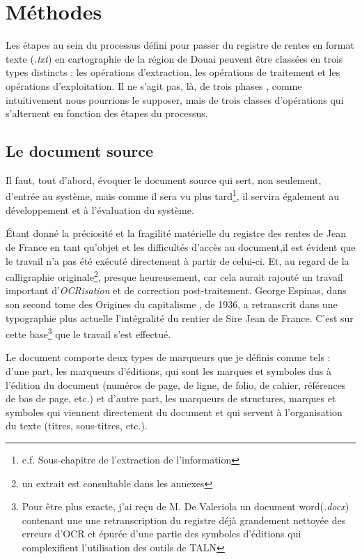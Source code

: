 \chapter{Méthodes}
Les étapes au sein du processus défini pour passer du registre de rentes en format texte (\textit{.txt}) en cartographie de la région de Douai peuvent être classées en trois types distincts : les opérations d’extraction, les opérations de traitement et les opérations d’exploitation. Il ne s’agit pas, là, de trois phases , comme intuitivement nous pourrions le supposer, mais de trois classes d'opérations qui s’alternent en fonction des étapes du processus.

\section{Le document source}
Il faut, tout d'abord, évoquer le document source qui sert, non seulement, d'entrée au système, mais comme  il sera vu plus tard\footnote{c.f. Sous-chapitre de l'extraction de l'information}, il servira également au développement et à l'évaluation du système.

Étant donné la préciosité et la fragilité matérielle du registre des rentes de Jean de France en tant qu'objet et les difficultés d'accès au document,il est évident que le travail n'a pas été exécuté directement à partir de celui-ci. Et, au regard de la calligraphie originale\footnote{un extrait est consultable dans les annexes}, presque heureusement, car cela aurait rajouté un travail important d'\textit{OCRisation} et de correction post-traitement. 
George Espinas, dans son second tome des \og Origines du capitalisme \fg , de 1936, a retranscrit dans une typographie plus actuelle l'intégralité du rentier de Sire Jean de France. C'est sur cette base\footnote{Pour être plus exacte, j'ai reçu de M. De Valeriola un document word(\textit{.docx}) contenant une une retranscription du registre déjà  grandement nettoyée des erreurs d'OCR et épurée d'une partie des symboles d'éditions qui complexifient l'utilisation des  outils de TALN} que le travail s'est effectué.

Le document comporte deux types de marqueurs que je définis comme tels : d'une part, les marqueurs d'éditions, qui sont les marques et symboles dus à l'édition du document (numéros de page, de ligne, de folio, de cahier, références de bas de page, etc.) et d'autre part, les marqueurs de structures, marques et symboles qui viennent directement du document et qui servent à l'organisation du texte (titres, sous-titres, etc.).

